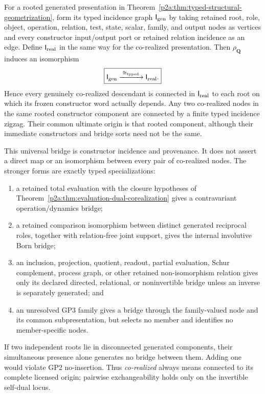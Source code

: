 \documentclass[12pt,a4paper]{article}
\begin{document}
\begin{theorem}
\label{p2a:thm:universal-corealization-bridge-normal-form}
For a rooted generated presentation in
Theorem~\ref{p2a:thm:typed-structural-geometrization}, form its typed incidence
graph \(\mathsf I_{\rm gen}\) by taking retained root, role, object, operation,
relation, test, state, scalar, family, and output nodes as vertices and every
constructor input/output port or retained relation incidence as an edge.
Define \(\mathsf I_{\rm real}\) in the same way for the co-realized
presentation.  Then \(\rho_{\mathbf Q}\) induces an isomorphism
\[
 \boxed{
 \mathsf I_{\rm gen}\xrightarrow{\;\cong_{\rm typed}\;}
 \mathsf I_{\rm real}.}
\]
Hence every genuinely co-realized descendant is connected in
\(\mathsf I_{\rm real}\) to each root on which its frozen constructor word
actually depends.  Any two co-realized nodes in the same rooted constructor
component are connected by a finite typed incidence zigzag.  Their common
ultimate origin is that rooted component, although their immediate
constructors and bridge sorts need not be the same.

This universal bridge is constructor incidence and provenance.  It does not
assert a direct map or an isomorphism between every pair of co-realized nodes.
The stronger forms are exactly typed specializations:
\begin{enumerate}[label=(\alph*),leftmargin=2em]
\item a retained total evaluation with the closure hypotheses of
      Theorem~\ref{p2a:thm:evaluation-dual-corealization} gives a
      contravariant operation/dynamics bridge;
\item a retained comparison isomorphism between distinct generated reciprocal roles,
      together with relation-free joint support, gives the internal
      involutive Born bridge;
\item an inclusion, projection, quotient, readout, partial evaluation, Schur
      complement, process graph, or other retained non-isomorphism relation
      gives only its declared directed, relational, or noninvertible bridge
      unless an inverse is separately generated; and
\item an unresolved GP3 family gives a bridge through the family-valued node
      and its common subpresentation, but selects no member and identifies no
      member-specific nodes.
\end{enumerate}
If two independent roots lie in disconnected generated components, their
simultaneous presence alone generates no bridge between them.  Adding one
would violate GP2 no-insertion.  Thus \emph{co-realized} always means connected
to its complete licensed origin; pairwise exchangeability holds only on the
invertible self-dual locus.
\end{theorem}
\end{document}
